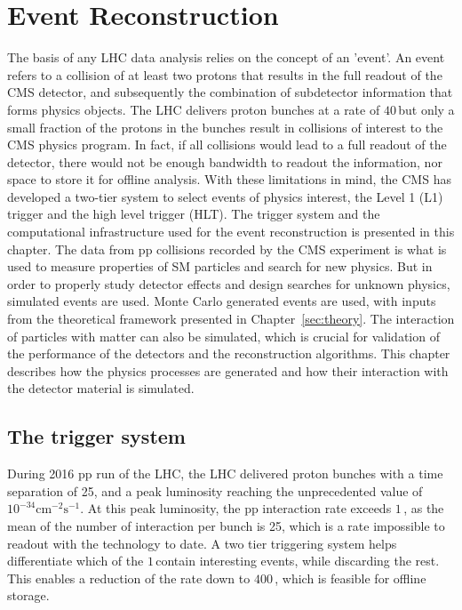 \chapter{Event Reconstruction}
\noindent\justify
The basis of any LHC data analysis relies on the concept of an 'event'. 
An event refers to a collision of at least two protons that results in the full readout of the CMS detector, and subsequently the combination of subdetector information that forms physics objects. 
The LHC delivers proton bunches at a rate of $40\,$\MHz but only a small fraction of the protons in the bunches result in collisions of interest to the CMS physics program.
In fact, if all collisions would lead to a full readout of the detector, there would not be enough bandwidth to readout the information, nor space to store it for offline analysis. 
With these limitations in mind, the CMS has developed a two-tier system to select events of physics interest, the Level 1 (L1) trigger and the high level trigger (HLT). 
\newpara
\noindent\justify
The trigger system and the computational infrastructure used for the event reconstruction is presented in this chapter. 
The data from pp collisions recorded by the CMS experiment is what is used to measure properties of SM particles and search for new physics. 
But in order to properly study detector effects and design searches for unknown physics, simulated events are used.  
Monte Carlo generated events are used, with inputs from the theoretical framework presented in Chapter~\ref{sec:theory}.
The interaction of particles with matter can also be simulated, which is crucial for validation of the performance of the detectors and the reconstruction algorithms.
This chapter describes how the physics processes are generated and how their interaction with the detector material is simulated.                                               
\newpage
\section{The trigger system}\label{trigger}
\noindent
\justify
During 2016 pp run of the LHC, the LHC delivered proton bunches with a time separation of 25\ns, and a peak luminosity reaching the unprecedented value of $10^{-34}\mathrm{cm}^{-2}\mathrm{s}^{-1}$. 
At this peak luminosity, the pp interaction rate exceeds $1\,$\GHz, as the mean of the number of interaction per bunch is 25, which is a rate impossible to readout with the technology to date.   
A two tier triggering system helps differentiate which of the $1\,$\GHz contain interesting events, while discarding the rest. 
This enables a reduction of the rate down to $400\,$\Hz, which is feasible for offline storage.   
